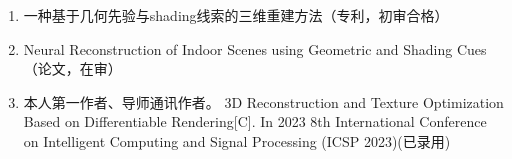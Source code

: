 
\achievement
\begin{enumerate}[leftmargin =0.7cm]
\renewcommand{\labelenumi}{[\theenumi]}
\item  一种基于几何先验与shading线索的三维重建方法（专利，初审合格）
\item Neural Reconstruction of Indoor Scenes using Geometric and Shading Cues（论文，在审）
\item 本人第一作者、导师通讯作者。 3D Reconstruction and Texture Optimization Based on Differentiable Rendering[C]. In 2023 8th International Conference on Intelligent Computing and Signal Processing (ICSP 2023)(已录用)

\end{enumerate}

